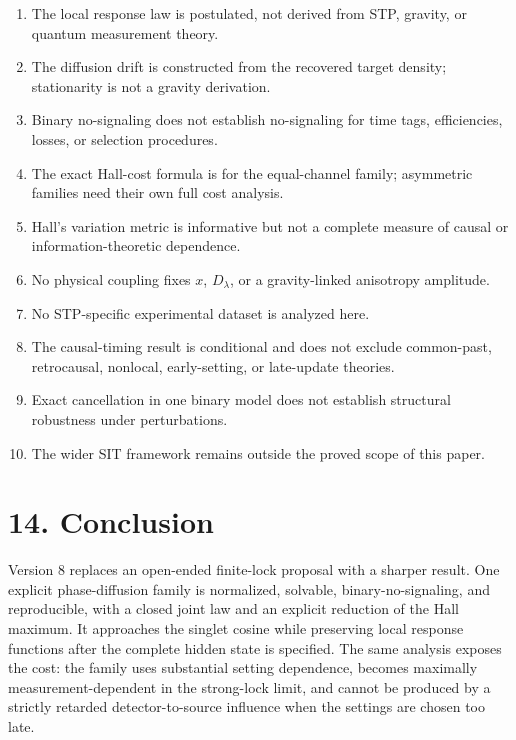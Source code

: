 \documentclass[
  american,
  11pt,
  letterpaper,
]{article}
\providecommand{\tightlist}{%
  \setlength{\itemsep}{0pt}\setlength{\parskip}{0pt}}
\begin{document}
\begin{enumerate}
\def\labelenumi{\arabic{enumi}.}
\tightlist
\item
  The local response law is postulated, not derived from STP, gravity, or quantum measurement theory.
\item
  The diffusion drift is constructed from the recovered target density; stationarity is not a gravity derivation.
\item
  Binary no-signaling does not establish no-signaling for time tags, efficiencies, losses, or selection procedures.
\item
  The exact Hall-cost formula is for the equal-channel family; asymmetric families need their own full cost analysis.
\item
  Hall's variation metric is informative but not a complete measure of causal or information-theoretic dependence.
\item
  No physical coupling fixes \(x\), \(D_\lambda\), or a gravity-linked anisotropy amplitude.
\item
  No STP-specific experimental dataset is analyzed here.
\item
  The causal-timing result is conditional and does not exclude common-past, retrocausal, nonlocal, early-setting, or late-update theories.
\item
  Exact cancellation in one binary model does not establish structural robustness under perturbations.
\item
  The wider SIT framework remains outside the proved scope of this paper.
\end{enumerate}

\section{14. Conclusion}\label{conclusion}

Version 8 replaces an open-ended finite-lock proposal with a sharper result. One explicit phase-diffusion family is normalized, solvable, binary-no-signaling, and reproducible, with a closed joint law and an explicit reduction of the Hall maximum. It approaches the singlet cosine while preserving local response functions after the complete hidden state is specified. The same analysis exposes the cost: the family uses substantial setting dependence, becomes maximally measurement-dependent in the strong-lock limit, and cannot be produced by a strictly retarded detector-to-source influence when the settings are chosen too late.
\end{document}
